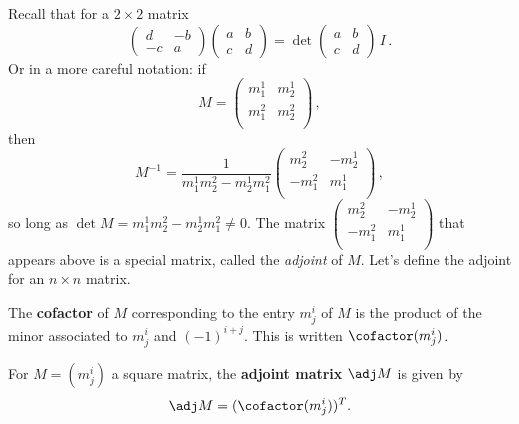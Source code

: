 Recall that for a $2\times 2$ matrix 
\[
\begin{pmatrix}d & -b \\ -c & a\end{pmatrix}\begin{pmatrix}a & b \\ c & d\end{pmatrix}
=\det \begin{pmatrix}a & b \\ c & d\end{pmatrix}\, I\, .
\]
Or in a more careful notation: if
\[M=\begin{pmatrix}
m^1_1 & m^1_2 \\[1mm]
m^2_1 & m^2_2 \\
\end{pmatrix}\, ,\] 
then \[M^{-1}=\frac{1}{m^1_1m^2_2-m^1_2m^2_1}\begin{pmatrix}
m^2_2 & -m^1_2 \\
-m^2_1 & m^1_1 \\
\end{pmatrix}\, ,\]
so long as $\det M=m^1_1m^2_2-m^1_2m^2_1\neq 0$.
  The  matrix $\begin{pmatrix}
m^2_2 & -m^1_2 \\
-m^2_1 & m^1_1 \\
\end{pmatrix}$ that appears above is a special matrix, called the \emph{adjoint} of $M$.  Let's define the adjoint for an $n \times n$ matrix.


The {\bf cofactor} of $M$ corresponding to the entry $m^i_j$ of $M$ 
is the product of the minor associated to $m^i_j$
and $(-1)^{i+j}$.  This is written $\cofactor(m^i_j)$.

\begin{definition}
For $M=(m^i_j)$ a square matrix, the {\bf adjoint matrix} $\adj M$ is given by
\[
\adj M = (\cofactor(m^i_j))^T.
\]
\end{definition}

